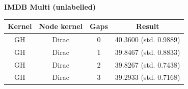 \documentclass{article}
\begin{document}
\textbf{IMDB Multi (unlabelled)}\\
\begin{minipage}{0.6\linewidth}
	\hspace*{-1in}

	\label{fig:imdb_multi_unlabelled}
\end{minipage}
\begin{minipage}[c]{0.5\linewidth}	
	\centering
	\begin{tabular}{c|c|c|c}
		Kernel & Node kernel & Gaps & Result\\
		\hline
		GH & Dirac & 0 & 40.3600 (std. 0.9889) \\
		GH & Dirac & 1 & 39.8467 (std. 0.8833) \\
		GH & Dirac & 2 & 39.8267 (std. 0.7438) \\
		GH & Dirac & 3 & 39.2933 (std. 0.7168) \\
	\end{tabular}
	\label{table:imdb_multi_unlabelled}
\end{minipage}
\end{document}
